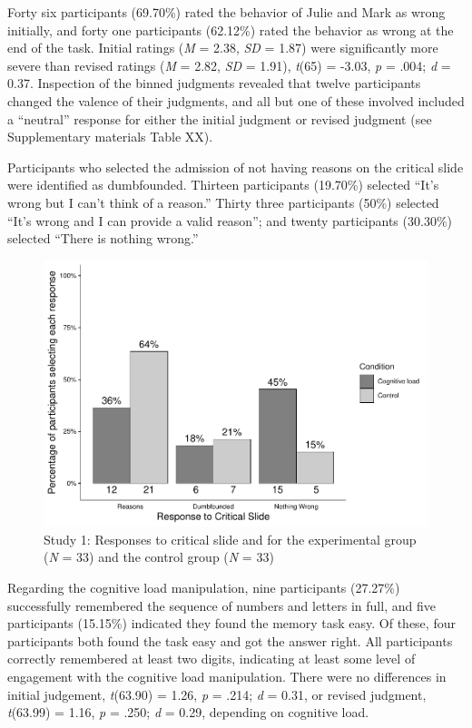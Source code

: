 \documentclass[
  american,
  man,floatsintext]{apa7}
\begin{document}
Forty six participants (69.70\%) rated the behavior of Julie and Mark as wrong initially, and forty one participants (62.12\%) rated the behavior as wrong at the end of the task. Initial ratings (\emph{M} = 2.38, \emph{SD} = 1.87) were significantly more severe than revised ratings (\emph{M} = 2.82, \emph{SD} = 1.91), \emph{t}(65) = -3.03, \emph{p} = .004; \emph{d} = 0.37. Inspection of the binned judgments revealed that twelve participants changed the valence of their judgments, and all but one of these involved included a ``neutral'' response for either the initial judgment or revised judgment (see Supplementary materials Table XX).

Participants who selected the admission of not having reasons on the critical slide were identified as dumbfounded. Thirteen participants (19.70\%) selected ``It's wrong but I can't think of a reason.'' Thirty three participants (50\%) selected ``It's wrong and I can provide a valid reason''; and twenty participants (30.30\%) selected ``There is nothing wrong.''

\begin{figure}
\centering
\includegraphics{cog_load_in_chunks_files/figure-latex/S1S1fig2criticalcondition-1.pdf}
\caption{\label{fig:S1S1fig2criticalcondition}Study 1: Responses to critical slide and for the experimental group (\emph{N} = 33) and the control group (\emph{N} = 33)}
\end{figure}

Regarding the cognitive load manipulation, nine participants (27.27\%) successfully remembered the sequence of numbers and letters in full, and five participants (15.15\%) indicated they found the memory task easy. Of these, four participants both found the task easy and got the answer right. All participants correctly remembered at least two digits, indicating at least some level of engagement with the cognitive load manipulation. There were no differences in initial judgement, \emph{t}(63.90) = 1.26, \emph{p} = .214; \emph{d} = 0.31, or revised judgment, \emph{t}(63.99) = 1.16, \emph{p} = .250; \emph{d} = 0.29, depending on cognitive load.
\end{document}
